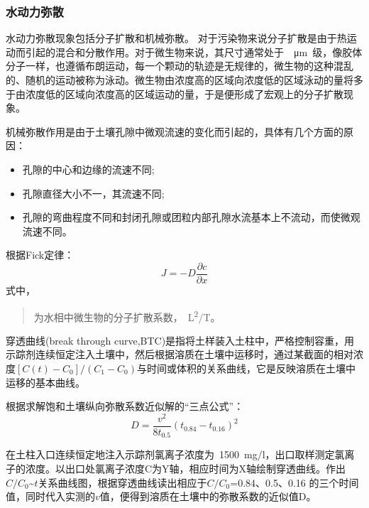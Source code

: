 \documentclass[a4paper,cs4size,adobefonts,fancyhdr]{ctexart}[2005/11/25]
\numberwithin{equation}{section} %
\begin{document}
\subsubsection{水动力弥散}
水动力弥散现象包括分子扩散和机械弥散。 对于污染物来说分子扩散是由于热运动而引起的混合和分散作用。对于微生物来说，其尺寸通常处于~\SI{}{\micro m}~级，像胶体分子一样，也遵循布朗运动，每一个颗动的轨迹是无规律的，微生物的这种混乱的、随机的运动被称为泳动。微生物由浓度高的区域向浓度低的区域泳动的量将多于由浓度低的区域向浓度高的区域运动的量，于是便形成了宏观上的分子扩散现象。\par
机械弥散作用是由于土壤孔隙中微观流速的变化而引起的，具体有几个方面的原因：
\begin{itemize}\setlength{\itemsep}{0em}
\item 孔隙的中心和边缘的流速不同;
\item 孔隙直径大小不一，其流速不同;
\item 孔隙的弯曲程度不同和封闭孔隙或团粒内部孔隙水流基本上不流动，而使微观流速不同。
\end{itemize}\par
根据Fick定律：
\begin{equation}
J=-D\dfrac{\partial c}{\partial x}
\end{equation}
式中，
\begin{quote}
	\begin{description}\setlength{\itemsep}{0em}
	\item[$D$]为水相中微生物的分子扩散系数，\SI{}{L^2/T}。
	\end{description}
	\end{quote}\par
穿透曲线(break through curve,BTC)是指将土样装入土柱中，严格控制容重，用示踪剂连续恒定注入土壤中，然后根据溶质在土壤中运移时，通过某截面的相对浓度$[C(t)-C_0]/(C_1-C_0)$与时间或体积的关系曲线，它是反映溶质在土壤中运移的基本曲线。\par
根据求解饱和土壤纵向弥散系数近似解的“三点公式”：
\begin{equation}
D=\dfrac{v^2}{8t_{0.5}}(t_{0.84}-t_{0.16})^2
\end{equation}\par
在土柱入口连续恒定地注入示踪剂氯离子浓度为~\SI{1500}{mg/l}，出口取样测定氯离子的浓度。以出口处氯离子浓度C为Y轴，相应时间为X轴绘制穿透曲线。作出$C/C_0$\~$t$关系曲线图，根据穿透曲线读出相应于$C/C_0$=0.84、0.5、0.16 的三个时间值，同时代入实测的$v$值，便得到溶质在土壤中的弥散系数的近似值D。
\end{document}
